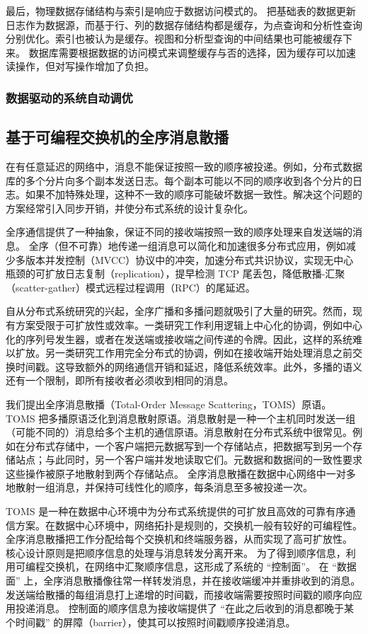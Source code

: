 最后，物理数据存储结构与索引是响应于数据访问模式的。
把基础表的数据更新日志作为数据源，而基于行、列的数据存储结构都是缓存，为点查询和分析性查询分别优化。索引也被认为是缓存。视图和分析型查询的中间结果也可能被缓存下来。
数据库需要根据数据的访问模式来调整缓存与否的选择，因为缓存可以加速读操作，但对写操作增加了负担。

\subsubsection{数据驱动的系统自动调优}
\label{future:data-driven-system}



\iffalse
\subsection{基于可编程交换机的全序消息散播}


在有任意延迟的网络中，消息不能保证按照一致的顺序被投递。例如，分布式数据库的多个分片向多个副本发送日志。每个副本可能以不同的顺序收到各个分片的日志。如果不加特殊处理，这种不一致的顺序可能破坏数据一致性。解决这个问题的方案经常引入同步开销，并使分布式系统的设计复杂化。

全序通信提供了一种抽象，保证不同的接收端按照一致的顺序处理来自发送端的消息。
全序（但不可靠）地传递一组消息可以简化和加速很多分布式应用，例如减少多版本并发控制（MVCC）协议中的冲突，加速分布式共识协议，实现无中心瓶颈的可扩放日志复制（replication），提早检测 TCP 尾丢包，降低散播-汇聚（scatter-gather）模式远程过程调用（RPC）的尾延迟。

自从分布式系统研究的兴起，全序广播和多播问题就吸引了大量的研究。然而，现有方案受限于可扩放性或效率。一类研究工作利用逻辑上中心化的协调，例如中心化的序列号发生器，或者在发送端或接收端之间传递的令牌。因此，这样的系统难以扩放。另一类研究工作用完全分布式的协调，例如在接收端开始处理消息之前交换时间戳。这导致额外的网络通信开销和延迟，降低系统效率。此外，多播的语义还有一个限制，即所有接收者必须收到相同的消息。

我们提出全序消息散播（Total-Order Message Scattering，TOMS）原语。
TOMS 把多播原语泛化到消息散射原语。消息散射是一种一个主机同时发送一组（可能不同的）消息给多个主机的通信原语。消息散射在分布式系统中很常见。例如在分布式存储中，一个客户端把元数据写到一个存储站点，把数据写到另一个存储站点；与此同时，另一个客户端并发地读取它们。元数据和数据间的一致性要求这些操作被原子地散射到两个存储站点。
全序消息散播在数据中心网络中一对多地散射一组消息，并保持可线性化的顺序，每条消息至多被投递一次。

TOMS 是一种在数据中心环境中为分布式系统提供的可扩放且高效的可靠有序通信方案。在数据中心环境中，网络拓扑是规则的，交换机一般有较好的可编程性。
全序消息散播把工作分配给每个交换机和终端服务器，从而实现了高可扩放性。
核心设计原则是把顺序信息的处理与消息转发分离开来。
为了得到顺序信息，利用可编程交换机，在网络中汇聚顺序信息，这形成了系统的 ``控制面''。
在 ``数据面'' 上，全序消息散播像往常一样转发消息，并在接收端缓冲并重排收到的消息。
发送端给散播的每组消息打上递增的时间戳，而接收端需要按照时间戳的顺序向应用投递消息。
控制面的顺序信息为接收端提供了 ``在此之后收到的消息都晚于某个时间戳'' 的屏障（barrier），使其可以按照时间戳顺序投递消息。

